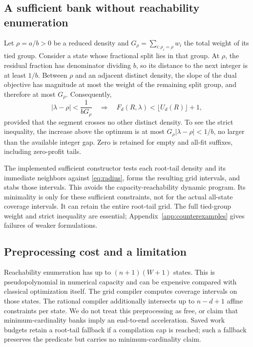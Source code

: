 \documentclass[referee,pdflatex,sn-mathphys-num]{sn-jnl}
\theoremstyle{thmstyleone}
\theoremstyle{thmstyletwo}
\begin{document}
\subsection{A sufficient bank without reachability enumeration}
Let $\rho=a/b>0$ be a reduced density and $G_\rho=\sum_{i:\rho_i=\rho}w_i$ the total weight of its tied group. Consider a state whose fractional split lies in that group. At $\rho$, the residual fraction has denominator dividing $b$, so its distance to the next integer is at least $1/b$. Between $\rho$ and an adjacent distinct density, the slope of the dual objective has magnitude at most the weight of the remaining split group, and therefore at most $G_\rho$. Consequently,
\begin{equation}\label{eq:radius}
 |\lambda-\rho|<\frac{1}{bG_\rho}
 \quad\Longrightarrow\quad
 F_d(R,\lambda)<\lfloor U_d(R)\rfloor+1,
\end{equation}
provided that the segment crosses no other distinct density. To see the strict inequality, the increase above the optimum is at most $G_\rho|\lambda-\rho|<1/b$, no larger than the available integer gap. Zero is retained for empty and all-fit suffixes, including zero-profit tails.

The implemented sufficient constructor tests each root-tail density and its immediate neighbors against \eqref{eq:radius}, forms the resulting grid intervals, and stabs those intervals. This avoids the capacity-reachability dynamic program. Its minimality is only for these sufficient constraints, not for the actual all-state coverage intervals. It can retain the entire root-tail grid. The full tied-group weight and strict inequality are essential; Appendix~\ref{app:counterexamples} gives failures of weaker formulations.

\subsection{Preprocessing cost and a limitation}
Reachability enumeration has up to $(n+1)(W+1)$ states. This is pseudopolynomial in numerical capacity and can be expensive compared with classical optimization itself. The grid compiler computes coverage intervals on those states. The rational compiler additionally intersects up to $n-d+1$ affine constraints per state. We do not treat this preprocessing as free, or claim that minimum-cardinality banks imply an end-to-end acceleration. Saved work budgets retain a root-tail fallback if a compilation cap is reached; such a fallback preserves the predicate but carries no minimum-cardinality claim.
\end{document}
